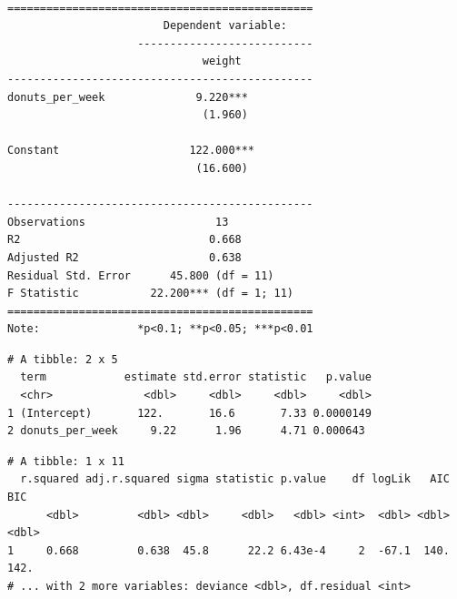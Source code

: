 \documentclass[]{book}
\newenvironment{Shaded}{\begin{snugshade}}{\end{snugshade}}
\newcommand{\KeywordTok}[1]{\textcolor[rgb]{0.13,0.29,0.53}{\textbf{#1}}}
\newcommand{\NormalTok}[1]{#1}
\newcommand{\OperatorTok}[1]{\textcolor[rgb]{0.81,0.36,0.00}{\textbf{#1}}}
\newcommand{\StringTok}[1]{\textcolor[rgb]{0.31,0.60,0.02}{#1}}
\begin{document}
\begin{verbatim}

===============================================
                        Dependent variable:    
                    ---------------------------
                              weight           
-----------------------------------------------
donuts_per_week              9.220***          
                              (1.960)          
                                               
Constant                    122.000***         
                             (16.600)          
                                               
-----------------------------------------------
Observations                    13             
R2                             0.668           
Adjusted R2                    0.638           
Residual Std. Error      45.800 (df = 11)      
F Statistic           22.200*** (df = 1; 11)   
===============================================
Note:               *p<0.1; **p<0.05; ***p<0.01
\end{verbatim}

\begin{Shaded}
\end{Shaded}

\begin{verbatim}
# A tibble: 2 x 5
  term            estimate std.error statistic   p.value
  <chr>              <dbl>     <dbl>     <dbl>     <dbl>
1 (Intercept)       122.       16.6       7.33 0.0000149
2 donuts_per_week     9.22      1.96      4.71 0.000643 
\end{verbatim}

\begin{Shaded}
\end{Shaded}

\begin{verbatim}
# A tibble: 1 x 11
  r.squared adj.r.squared sigma statistic p.value    df logLik   AIC   BIC
      <dbl>         <dbl> <dbl>     <dbl>   <dbl> <int>  <dbl> <dbl> <dbl>
1     0.668         0.638  45.8      22.2 6.43e-4     2  -67.1  140.  142.
# ... with 2 more variables: deviance <dbl>, df.residual <int>
\end{verbatim}
\end{document}
